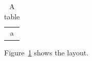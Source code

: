 \documentclass{article}
\begin{document}
\begin{table}[ht]
\centering
\begin{tabular}{c} a \end{tabular}
\caption{A table}\label{tab:main}
\end{table}
Figure~\ref{tab:main} shows the layout.
\end{document}
